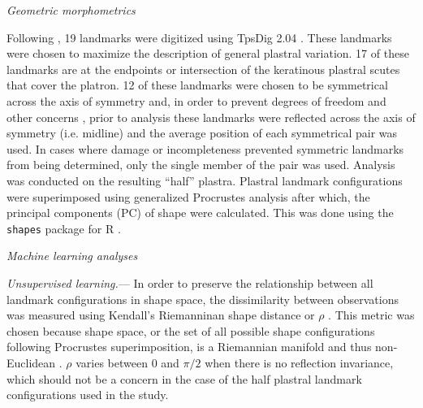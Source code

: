 \documentclass[12pt,letterpaper]{article}\usepackage{graphicx, color}
\renewcommand{\subsection}[1]{%
\bigskip
\begin{center}
\begin{large}
\normalfont\itshape #1
\end{large}
\end{center}}
\renewcommand{\subsubsection}[1]{%
\vspace{2ex}
\noindent
\textit{#1.}---}
\begin{document}
\subsection{Geometric morphometrics}
Following \citet{Angielczyk2011}, 19 landmarks were digitized using TpsDig 2.04 \citep{Rohlf2005}. These landmarks were chosen to maximize the description of general plastral variation. 17 of these landmarks are at the endpoints or intersection of the keratinous plastral scutes that cover the platron. 12 of these landmarks were chosen to be symmetrical across the axis of symmetry and, in order to prevent degrees of freedom and other concerns \citep{Klingenberg2007}, prior to analysis these landmarks were reflected across the axis of symmetry (i.e. midline) and the average position of each symmetrical pair was used. In cases where damage or incompleteness prevented symmetric landmarks from being determined, only the single member of the pair was used. Analysis was conducted on the resulting ``half'' plastra.
Plastral landmark configurations were superimposed using generalized Procrustes analysis \citep{Dryden1998a} after which, the principal components (PC) of shape were calculated. This was done using the \texttt{shapes} package for R \citep{2013, Dryden2013}.


\subsection{Machine learning analyses}
\subsubsection{Unsupervised learning}
In order to preserve the relationship between all landmark configurations in shape space, the dissimilarity between observations was measured using Kendall's Riemanninan shape distance or \(\rho\) \citep{Kendall1984a,Dryden1998a}. This metric was chosen because shape space, or the set of all possible shape configurations following Procrustes superimposition, is a Riemannian manifold and thus non-Euclidean \citep{Dryden1998a}. \(\rho\) varies between 0 and \(\pi / 2\) when there is no reflection invariance, which should not be a concern in the case of the half plastral landmark configurations used in the study.
\end{document}
